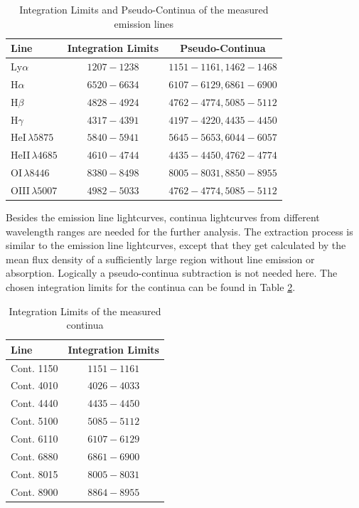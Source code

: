 \begin{table}[h!]
	\centering
	\small
	\caption{Integration Limits and Pseudo-Continua of the measured emission lines}
	\label{tab:emission_lines}
	\begin{tabular}{lcc}
		\hline
		\hline
		\textbf{Line} & \textbf{Integration Limits} & \textbf{Pseudo-Continua}  \\
		\hline
		Ly$\alpha$ & $1207-1238$ & $1151-1161, 1462-1468$\\
		\hline
		H$\alpha$ & $6520-6634$ & $6107-6129, 6861-6900$ \\
		H$\beta$ & $4828-4924$ & $4762-4774, 5085-5112$ \\
		H$\gamma$ & $4317-4391$ & $4197-4220, 4435-4450$ \\
		
		HeI$\,\lambda5875$ & $5840-5941$ & $5645-5653, 6044-6057$ \\
		HeII$\,\lambda4685$ & $4610-4744$ & $4435-4450, 4762-4774$ \\
		OI$\,\lambda 8446$ & $8380-8498$ & $8005-8031, 8850-8955$ \\
		\hline
		OIII$\,\lambda 5007$ & $4982-5033$ & $4762-4774, 5085-5112$ \\
		\hline
		\hline
	\end{tabular}
\end{table}


Besides the emission line lightcurves, continua lightcurves from different wavelength ranges are needed for the further analysis. The extraction process is similar to the emission line lightcurves, except that they get calculated by the mean flux density of a sufficiently large region without line emission or absorption. Logically a pseudo-continua subtraction is not needed here. The chosen integration limits for the continua can be found in Table \ref{tab:continua}.


\begin{table}[h!]
	\centering
	\small
	\caption{Integration Limits of the measured continua}
	\label{tab:continua}
	\begin{tabular}{lc}
		\hline
		\hline
		\textbf{Line} & \textbf{Integration Limits}  \\
		\hline
		Cont. 1150 & $1151-1161$\\
		\hline
		Cont. 4010 & $4026-4033$\\
		Cont. 4440 & $4435-4450$\\
		Cont. 5100 & $5085-5112$\\
		Cont. 6110 & $6107-6129$\\
		Cont. 6880 & $6861-6900$\\
		Cont. 8015 & $8005-8031$\\
		Cont. 8900 & $8864-8955$\\
		\hline
		\hline
	\end{tabular}
\end{table}

